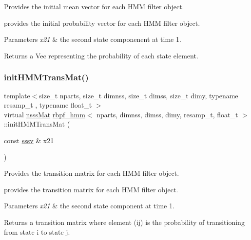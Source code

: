 Provides the initial mean vector for each H\+MM filter object. 

provides the initial probability vector for each H\+MM filter object. 
\begin{DoxyParams}{Parameters}
{\em x21} & the second state componenent at time 1. \\
\hline
\end{DoxyParams}
\begin{DoxyReturn}{Returns}
a Vec representing the probability of each state element. 
\end{DoxyReturn}
\mbox{\label{classrbpf__hmm_a997a21d39e1f692c28968000e809309a}} 
\subsubsection{\texorpdfstring{init\+H\+M\+M\+Trans\+Mat()}{initHMMTransMat()}}
{\footnotesize\ttfamily template$<$size\+\_\+t nparts, size\+\_\+t dimnss, size\+\_\+t dimss, size\+\_\+t dimy, typename resamp\+\_\+t , typename float\+\_\+t $>$ \\
virtual \hyperlink{classrbpf__hmm_a7ae942768da71581665168d3c3063c3f}{nsss\+Mat} \hyperlink{classrbpf__hmm}{rbpf\+\_\+hmm}$<$ nparts, dimnss, dimss, dimy, resamp\+\_\+t, float\+\_\+t $>$\+::init\+H\+M\+M\+Trans\+Mat (\begin{DoxyParamCaption}\item[{const \hyperlink{classrbpf__hmm_a28e8ad1d93bcf53cb74603f74826a81c}{sssv} \&}]{x21 }\end{DoxyParamCaption})\hspace{0.3cm}{\ttfamily [pure virtual]}}



Provides the transition matrix for each H\+MM filter object. 

provides the transition matrix for each H\+MM filter object. 
\begin{DoxyParams}{Parameters}
{\em x21} & the second state component at time 1. \\
\hline
\end{DoxyParams}
\begin{DoxyReturn}{Returns}
a transition matrix where element (ij) is the probability of transitioning from state i to state j. 
\end{DoxyReturn}
\mbox{\label{classrbpf__hmm_a4ae74e05f31f74d26be47da29fc0ed96}} 
